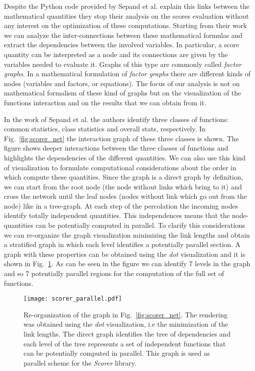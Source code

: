 \documentclass{standalone}
\begin{document}
Despite the Python code provided by Sepand et al. explain this links between the mathematical quantities they stop their analysis on the scores evaluation without any interest on the optimization of these computations.
Starting from their work we can analyze the inter-connections between these mathematical formulas and extract the dependencies between the involved variables.
In particular, a score quantity can be interpreted as a node and its connections are given by the variables needed to evaluate it.
Graphs of this type are commonly called \emph{factor graphs}.
In a mathematical formulation of \emph{factor graphs} there are different kinds of nodes (variables and factors, or equations).
The focus of our analysis is not on mathematical formalism of these kind of graphs but on the visualization of the functions interaction and on the results that we can obtain from it.

In the work of Sepand et al. the authors identify three classes of functions: common statistics, class statistics and overall stats, respectively.
In Fig.~\ref{fig:scorer_net} the interaction graph of these three classes is shown.
The figure shows deeper interactions between the three classes of functions and highlights the dependencies of the different quantities.
We can also use this kind of visualization to formulate computational considerations about the order in which compute these quantities.
Since the graph is a direct graph by definition, we can start from the root node (the node without links which bring to it) and cross the network until the leaf nodes (nodes without link which go out from the node) like in a tree-graph.
At each step of the percolation the incoming nodes identify totally independent quantities.
This independences means that the node-quantities can be potentially computed in parallel.
To clarify this considerations we can re-organize the graph visualization minimizing the link lengths and obtain a stratified graph in which each level identifies a potentially parallel section.
A graph with these properties can be obtained using the \emph{dot} visualization and it is shown in Fig.~\ref{fig:scorer_parallel}.
As can be seen in the figure we can identify 7 levels in the graph and so 7 potentially parallel regions for the computation of the full set of functions.

\begin{center}
\begin{figure}[htbp]
\hspace{-2cm}
\texttt{[image: scorer\_parallel.pdf]}
\caption{Re-organization of the graph in Fig.~\ref{fig:scorer_net}.
The rendering was obtained using the \emph{dot} visualization, i.e the minimization of the link lengths.
The direct graph identifies the tree of dependencies and each level of the tree represents a set of independent functions that can be potentially computed in parallel.
This graph is used as parallel scheme for the \emph{Scorer} library.
}
\label{fig:scorer_parallel}
\end{figure}
\end{center}
\end{document}
